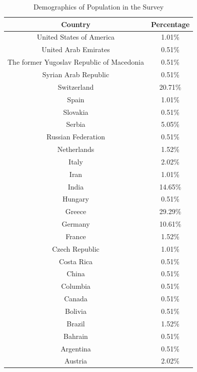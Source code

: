 \begin{table}[h!]
  \centering
  \caption{Demographics of Population in the Survey}
  \label{tab:demo}
  \begin{tabular}{cc}
    \toprule
     Country&Percentage\\
    \midrule
United States of America&1.01\%\\
United Arab Emirates&0.51\%\\
The former Yugoslav Republic of Macedonia&0.51\%\\
Syrian Arab Republic	&0.51\%\\
Switzerland&20.71\%\\
Spain	&1.01\%\\
Slovakia	&0.51\%\\
Serbia&	5.05\%\\
Russian Federation&	0.51\%\\
Netherlands	&1.52\%\\
Italy	&2.02\%\\
Iran&1.01\%\\
India	&14.65\%\\
Hungary	&0.51\%\\
Greece	&29.29\%\\
Germany	&10.61\%\\
France	&1.52\%\\
Czech Republic	&1.01\%\\
Costa Rica	&0.51\%\\
China	&0.51\%\\
Columbia	&0.51\%\\
Canada	&0.51\%\\
Bolivia	&0.51\%\\
Brazil	&1.52\%\\
Bahrain	&0.51\%\\
Argentina	&0.51\%\\
Austria & 2.02\%\\
    \bottomrule
  \end{tabular}
\end{table}

